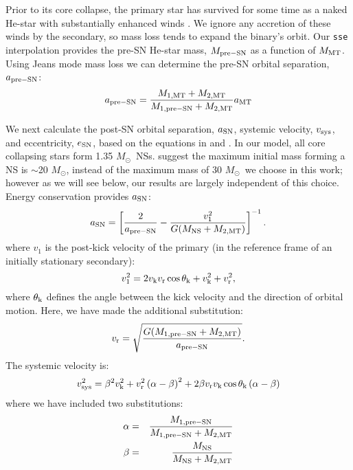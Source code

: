 \documentclass[usenatbib]{mnras}
\newcommand{\Msun}{\ifmmode {M_{\odot}}\else${M_{\odot}}$\fi}
\begin{document}
Prior to its core collapse, the primary star has survived for some time as a naked He-star with substantially enhanced winds \cite{belczynski10}. We ignore any accretion of these winds by the secondary, so mass loss tends to expand the binary's orbit. Our {\tt sse} interpolation provides the pre-SN He-star mass, $M_{\rm pre-SN}$ as a function of $M_{\rm MT}$. Using Jeans mode mass loss we can determine the pre-SN orbital separation, $a_{\rm pre-SN}$:
\begin{equation}
a_{\rm pre-SN} = \frac{M_{\rm 1, MT} + M_{\rm 2, MT}}{M_{\rm 1, pre-SN} + M_{\rm 2, MT}} a_{\rm MT}
\end{equation}


We next calculate the post-SN orbital separation, $a_{\rm SN}$, systemic velocity, $v_{\rm sys}$, and eccentricity, $e_{\rm SN}$, based on the equations in \citet{hills83} and \citet{kalogera96}. In our model, all core collapsing stars form 1.35 \Msun\ NSs. \citet{timmes96} suggest the maximum initial mass forming a NS is $\sim$20 \Msun, instead of the maximum mass of 30 \Msun\ we choose in this work; however as we will see below, our results are largely independent of this choice. Energy conservation provides $a_{\rm SN}$:
\begin{equation}
a_{\rm SN} = \left[ \frac{2 }{a_{\rm pre-SN}}  - \frac{v_1^2}{G(M_{\rm NS} + M_{\rm 2, MT})} \right]^{-1}. \label{eq:SN_A} \\
\end{equation}
where $v_1$ is the post-kick velocity of the primary (in the reference frame of an initially stationary secondary):
\begin{equation}
v_1^2 = 2v_{\rm k} v_{\rm r} \cos \theta_{\rm k} + v_{\rm k}^2 + v_{\rm r}^2, \label{eq:v_1}
\end{equation}
where $\theta_{\rm k}$ defines the angle between the kick velocity and the direction of orbital motion. Here, we have made the additional substitution:
\begin{equation}
v_{\rm r} = \sqrt{\frac{G (M_{\rm 1, pre-SN} + M_{\rm 2, MT})}{a_{\rm pre-SN}}}. \label{eq:v_r}
\end{equation}
The systemic velocity is:
\begin{equation}
v_{\rm sys}^2 = \beta^2 v_{\rm k}^2
   + v_{\rm r}^2 \left( \alpha - \beta \right)^2
   + 2 \beta v_{\rm r} v_{\rm k} \cos \theta_{\rm k} \left( \alpha - \beta \right)
    \label{eq:SN_v_sys}
\end{equation}
where we have included two substitutions:
\begin{eqnarray}
\alpha &=& \frac{M_{\rm 1, pre-SN}}{M_{\rm 1, pre-SN} + M_{\rm 2, MT}} \\
\beta &=& \frac{M_{\rm NS}}{M_{\rm NS} + M_{\rm 2, MT}}
\end{eqnarray}
\end{document}
